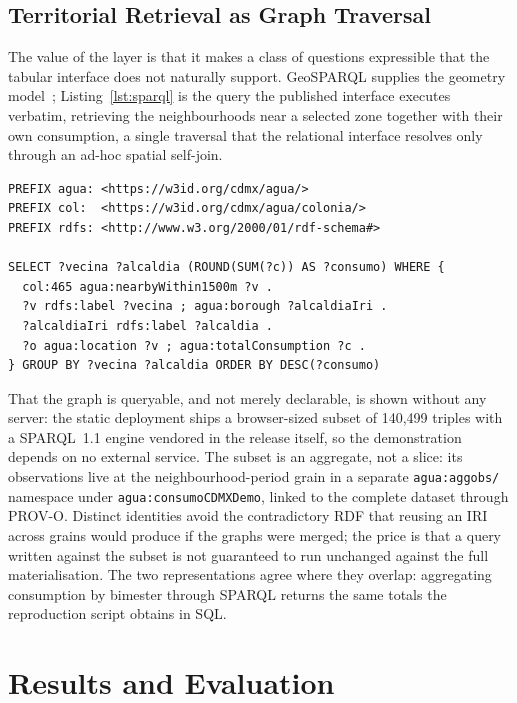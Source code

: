 \documentclass[runningheads]{llncs}
\newif\ifmarcarcambios
\newcommand{\icokg}[1]{\ifmarcarcambios\textcolor{nuevo}{#1}\else#1\fi}
\newenvironment{icokgblock}{\ifmarcarcambios\color{nuevo}\fi}{}
\renewcommand{\_}{\origunderscore\allowbreak}
\begin{document}
\begin{icokgblock}
\subsection{Territorial Retrieval as Graph Traversal}
\label{sec:sparql}

The value of the layer is that it makes a class of questions expressible that the
tabular interface does not naturally support. GeoSPARQL supplies the geometry
model~\cite{carhomburg2022}; \icokg{Listing~\ref{lst:sparql} is
the query the published interface executes verbatim}, retrieving the
neighbourhoods near a selected zone together with their own consumption, a
single traversal that the relational interface resolves only through an ad-hoc
spatial self-join.

\begin{lstlisting}[caption={\icokg{Territorial traversal over the knowledge graph, as executed by \texttt{vecindad.html}.}},label={lst:sparql}]
PREFIX agua: <https://w3id.org/cdmx/agua/>
PREFIX col:  <https://w3id.org/cdmx/agua/colonia/>
PREFIX rdfs: <http://www.w3.org/2000/01/rdf-schema#>

SELECT ?vecina ?alcaldia (ROUND(SUM(?c)) AS ?consumo) WHERE {
  col:465 agua:nearbyWithin1500m ?v .
  ?v rdfs:label ?vecina ; agua:borough ?alcaldiaIri .
  ?alcaldiaIri rdfs:label ?alcaldia .
  ?o agua:location ?v ; agua:totalConsumption ?c .
} GROUP BY ?vecina ?alcaldia ORDER BY DESC(?consumo)
\end{lstlisting}

That the graph is queryable, and not merely declarable, is shown without any
server: the static deployment ships a browser-sized subset of \icokg{140,499} triples
with a SPARQL~1.1 engine \icokg{vendored in the release itself, so the
demonstration depends on no external service}. \icokg{The subset is an aggregate, not a slice: its observations live at the
neighbourhood-period grain in a separate \texttt{agua:aggobs/} namespace under
\texttt{agua:consumoCDMXDemo}, linked to the complete dataset through PROV-O.
Distinct identities avoid the contradictory RDF that reusing an IRI across grains
would produce if the graphs were merged; the price is that a query written
against the subset is not guaranteed to run unchanged against the full
materialisation.} The two
representations agree where they overlap: aggregating consumption by bimester
through SPARQL returns the same totals the reproduction script obtains in SQL.
\end{icokgblock}

\section{Results and Evaluation}
\label{sec:res}
\end{document}
